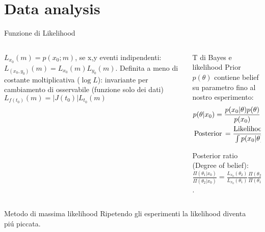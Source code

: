 \section{Data analysis}

\begin{frame}{Funzione di Likelihood}
\begin{columns}[T]
	\begin{column}{0.5\textwidth}
		$L_{x_0}(m)=p(x_0;m)$, se x,y eventi indipendenti: $L_{(x_0,y_0)}(m)=L_{x_0}(m)L_{y_0}(m)$. Definita a meno di costante moltiplicativa ($\log{L}$): invariante per cambiamento di osservabile (funzione solo dei dati)
		$L_{f(t_0)}(m)=|J(t_0)|L_{t_0}(m)$
	\end{column}
	\begin{column}{0.5\textwidth}
		\begin{block}{T di Bayes e likelihood}
			Prior $p(\theta)$ contiene belief su parametro fino al nostro esperimento:
			\begin{align*}
			&p(\theta|x_0)=\frac{p(x_0|\theta)p(\theta)}{p(x_0)}\\
			&\operatorname{Posterior}{}=\frac{\operatorname{Likelihood}{}\operatorname{Prior}{}}{\int p(x_0|\theta)p(\theta)\,d\theta}
			\end{align*}
			
			Posterior ratio (Degree of belief): $\frac{\Pi(\theta_1|x_0)}{\Pi(\theta_2|x_0)}=\frac{L_{x_0}(\theta_2)}{L_{x_0}(\theta_1)}\frac{\Pi(\theta_2)}{\Pi(\theta_1)}$.
		\end{block}
	\end{column}
\end{columns} 
\begin{columns}[T]
	\begin{column}{0.5\textwidth}
		\begin{block}{Metodo di massima likelihood}
			Ripetendo gli esperimenti la likelihood diventa pi\'u piccata.
		\end{block}
	\end{column}
	\begin{column}{0.5\textwidth}
		
	\end{column}
\end{columns}
\end{frame}

